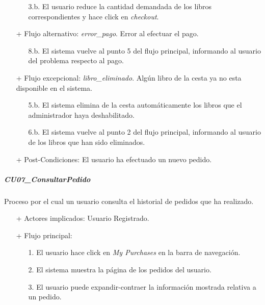 \documentclass[a4paper]{article}
\begin{document}
\begin{itemize}
\begin{itemize}
                        \item[3.b.] El usuario reduce la cantidad demandada de los libros correspondientes y hace click en \emph{checkout}.
                    \end{itemize}
                    \item[+] Flujo alternativo: \emph{error\_pago}. Error al efectuar el pago.
                    \begin{itemize}
                        \item[8.b.] El sistema vuelve al punto 5 del flujo principal, informando al usuario del problema respecto al pago.
                    \end{itemize}
                    \item[+] Flujo excepcional: \emph{libro\_eliminado}. Algún libro de la cesta ya no esta disponible en el sistema.
                    \begin{itemize}
                        \item[5.b.] El sistema elimina de la cesta automáticamente los libros que el administrador haya deshabilitado.
                        \item[6.b.] El sistema vuelve al punto 2 del flujo principal, informando al usuario de los libros que han sido eliminados.
                    \end{itemize}
                    \item[+] Post-Condiciones: El usuario ha efectuado un nuevo pedido.
                \end{itemize}

            \subparagraph{CU07\_ConsultarPedido}
                Proceso por el cual un usuario consulta el historial de pedidos que ha realizado.
                \begin{itemize}
                    \item[+] Actores implicados: Usuario Registrado.
                    \item[+] Flujo principal:
                    \begin{enumerate}
                        \item[1.] El usuario hace click en \emph{My Purchases} en la barra de navegación.
                        \item[2.] El sistema muestra la página de los pedidos del usuario.
                        \item[3.] El usuario puede expandir-contraer la información mostrada relativa a un pedido.
                    \end{enumerate}
                \end{itemize}
\end{document}
